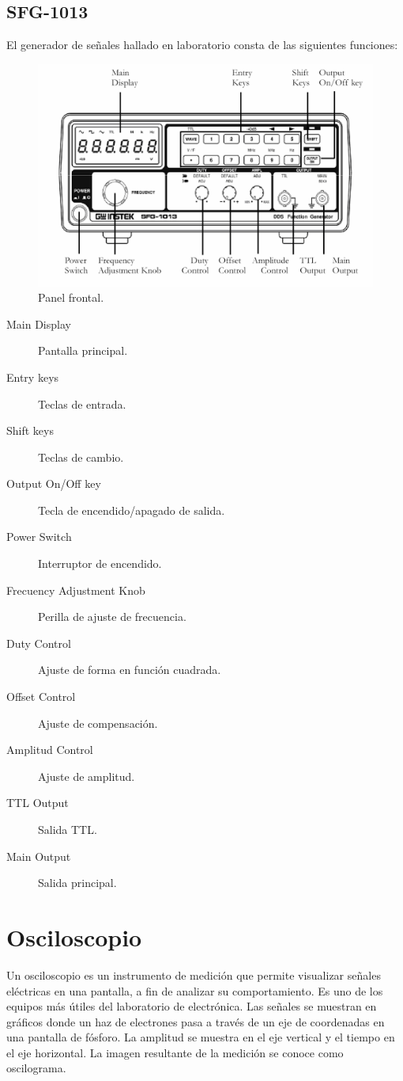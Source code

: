 \documentclass[letter,twoside,11pt]{article}
\begin{document}
\subsection{SFG-1013}
El generador de señales hallado en laboratorio consta de las siguientes
funciones:

\begin{figure}[!h]
\centering
\includegraphics[scale=0.40]{figura2.eps}
\caption{Panel frontal.}
\end{figure}

\begin{description}
    \item [Main Display] Pantalla principal.
    \item [Entry keys] Teclas de entrada.
    \item [Shift keys] Teclas de cambio.
    \item [Output On/Off key] Tecla de encendido/apagado de salida.
    \item [Power Switch] Interruptor de encendido.
    \item [Frecuency Adjustment Knob] Perilla de ajuste de frecuencia.
    \item [Duty Control] Ajuste de forma en función cuadrada.
    \item [Offset Control] Ajuste de compensación.
    \item [Amplitud Control] Ajuste de amplitud.
    \item [TTL Output] Salida TTL.
    \item [Main Output] Salida principal.
\end{description}

\section{Osciloscopio}
Un osciloscopio es un instrumento de medición que permite visualizar señales
eléctricas en una pantalla, a fin de analizar su comportamiento. Es uno de los
equipos más útiles del laboratorio de electrónica. Las señales se muestran en
gráficos donde un haz de electrones pasa a través de un eje de coordenadas en
una pantalla de fósforo. La amplitud se muestra en el eje vertical y el tiempo
en el eje horizontal. La imagen resultante de la medición se conoce como
oscilograma.
\end{document}
